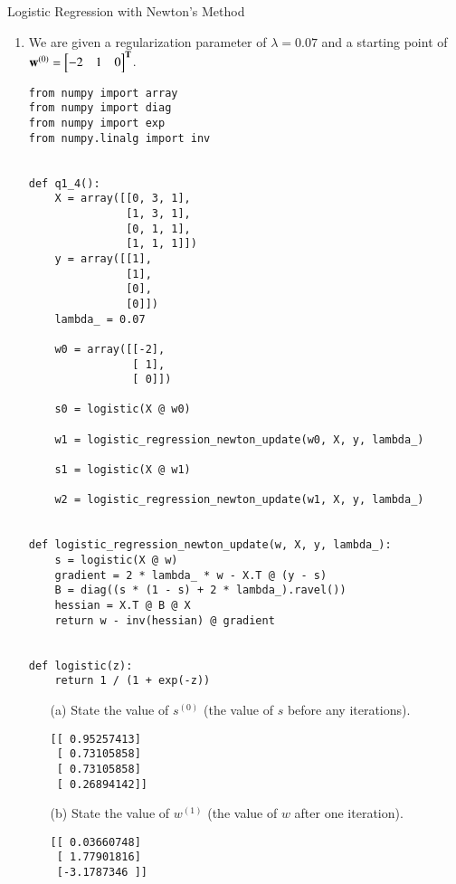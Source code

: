 \documentclass[section]{problemset}
\begin{document}
\begin{problem}{Logistic Regression with Newton's Method}
\begin{enumerate}
\item
We are given a regularization parameter of $\lambda = 0.07$ and
a starting point of $\mathbf w^{(0)} = \begin{bmatrix} -2 & 1 & 0 \end{bmatrix}^{\mathbf{T}}$.
\begin{mdframed}
  \begin{verbatim}
from numpy import array
from numpy import diag
from numpy import exp
from numpy.linalg import inv


def q1_4():
    X = array([[0, 3, 1],
               [1, 3, 1],
               [0, 1, 1],
               [1, 1, 1]])
    y = array([[1],
               [1],
               [0],
               [0]])
    lambda_ = 0.07

    w0 = array([[-2],
                [ 1],
                [ 0]])

    s0 = logistic(X @ w0)

    w1 = logistic_regression_newton_update(w0, X, y, lambda_)

    s1 = logistic(X @ w1)

    w2 = logistic_regression_newton_update(w1, X, y, lambda_)


def logistic_regression_newton_update(w, X, y, lambda_):
    s = logistic(X @ w)
    gradient = 2 * lambda_ * w - X.T @ (y - s)
    B = diag((s * (1 - s) + 2 * lambda_).ravel())
    hessian = X.T @ B @ X
    return w - inv(hessian) @ gradient


def logistic(z):
    return 1 / (1 + exp(-z))
  \end{verbatim}
\end{mdframed}

\begin{itemize}
\item[(a)]
State the value of $s^{(0)}$ (the value of $s$ before any iterations).

\begin{mdframed}
\begin{verbatim}
[[ 0.95257413]
 [ 0.73105858]
 [ 0.73105858]
 [ 0.26894142]]
\end{verbatim}
\end{mdframed}


\item[(b)]
State the value of $w^{(1)}$ (the value of $w$ after one iteration).
\begin{mdframed}
\begin{verbatim}
[[ 0.03660748]
 [ 1.77901816]
 [-3.1787346 ]]
\end{verbatim}
\end{mdframed}



\end{itemize}
\end{enumerate}
\end{problem}
\end{document}
